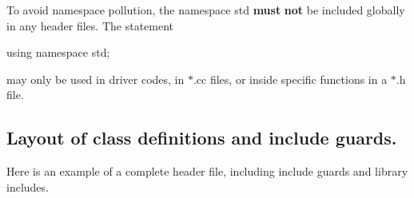 \begin{DoxyItemize}
\item To avoid namespace pollution, the namespace {\ttfamily std} {\bfseries must} {\bfseries not} be included globally in any header files. The statement 
\begin{DoxyCode}
\textcolor{keyword}{using namespace }std;
\end{DoxyCode}
 may only be used in driver codes, in $\ast$.cc files, or inside specific functions in a $\ast$.h file.
\end{DoxyItemize}\hypertarget{index_layout_classes}{}\subsection{Layout of class definitions and include guards.}\label{index_layout_classes}
Here is an example of a complete header file, including include guards and library includes. 
